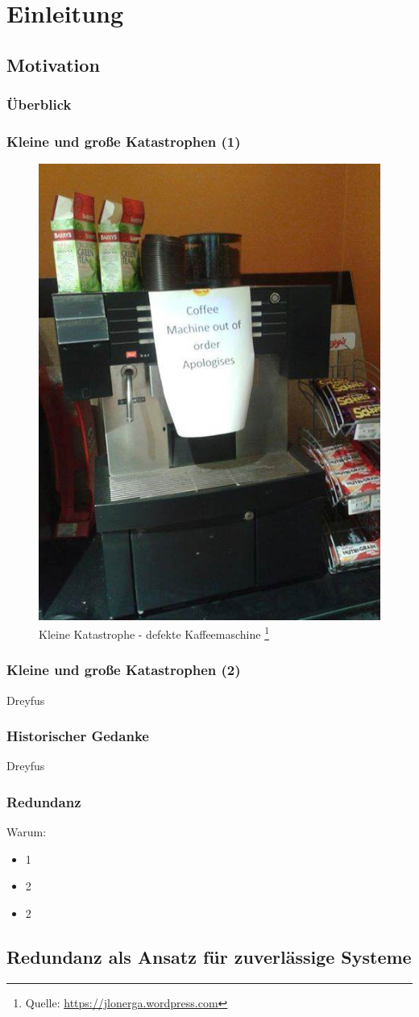 \section{Einleitung}
\subsection{Motivation}
%
%
\begin{frame}
	\frametitle{Überblick}
	\tableofcontents[currentsubsection]
\end{frame}
%
%
\begin{frame}
	\frametitle{Kleine und große Katastrophen (1)}
	\begin{figure}
		\includegraphics[scale=0.36]{grafiken/broken2}
		
		
	
		
		\caption{Kleine Katastrophe - defekte Kaffeemaschine
			\footnote{\tiny Quelle: \url{https://jlonerga.wordpress.com} }
		}		
	\end{figure}
\end{frame}
%
%
\begin{frame}
	\frametitle{Kleine und große Katastrophen (2)}
	Dreyfus
\end{frame}%
%
\begin{frame}
	\frametitle{Historischer Gedanke}
	Dreyfus
\end{frame}
\begin{frame}
	\frametitle{Redundanz}
	Warum:
	\begin{itemize}
		\item 1 
		\item 2
		\item 2
	\end{itemize}	
	
\end{frame}

\subsection{Redundanz als Ansatz für zuverlässige Systeme}
